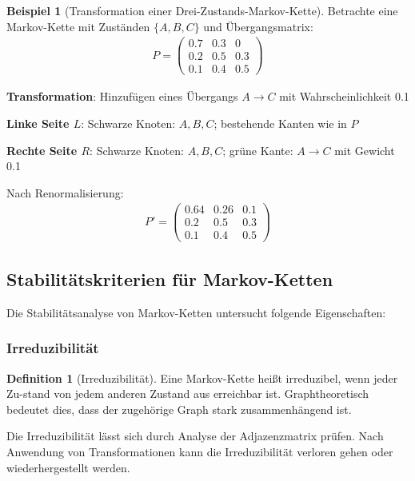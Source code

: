 \documentclass[a4paper,12pt]{article}
\theoremstyle{definition}
\newtheorem{definition}{Definition}
\newtheorem{beispiel}{Beispiel}
\begin{document}
\begin{beispiel}[Transformation einer Drei-Zustands-Markov-Kette]
	Betrachte eine Markov-Kette mit Zuständen $\{A, B, C\}$ und Übergangsmatrix:
	\begin{align*}
		P = \begin{pmatrix}
			0.7 & 0.3 & 0 \\
			0.2 & 0.5 & 0.3 \\
			0.1 & 0.4 & 0.5
		\end{pmatrix}
	\end{align*}
	
	\textbf{Transformation}: Hinzufügen eines Übergangs $A \rightarrow C$ mit Wahrscheinlichkeit 0.1
	
	\textbf{Linke Seite $L$}: Schwarze Knoten: $A, B, C$; bestehende Kanten wie in $P$
	
	\textbf{Rechte Seite $R$}: Schwarze Knoten: $A, B, C$; grüne Kante: $A \rightarrow C$ mit Gewicht 0.1
	
	Nach Renormalisierung:
	\begin{align*}
		P' = \begin{pmatrix}
			0.64 & 0.26 & 0.1 \\
			0.2 & 0.5 & 0.3 \\
			0.1 & 0.4 & 0.5
		\end{pmatrix}
	\end{align*}
\end{beispiel}

\subsection{Stabilitätskriterien für Markov-Ketten}

Die Stabilitätsanalyse von Markov-Ketten untersucht folgende Eigenschaften:

\subsubsection{Irreduzibilität}

\begin{definition}[Irreduzibilität]
	Eine Markov-Kette heißt irreduzibel, wenn jeder Zu-stand von jedem anderen Zustand aus erreichbar ist. Graphtheoretisch bedeutet dies, dass der zugehörige Graph stark zusammenhängend ist.
\end{definition}

Die Irreduzibilität lässt sich durch Analyse der Adjazenzmatrix prüfen. Nach Anwendung von Transformationen kann die Irreduzibilität verloren gehen oder wiederhergestellt werden.
\end{document}

